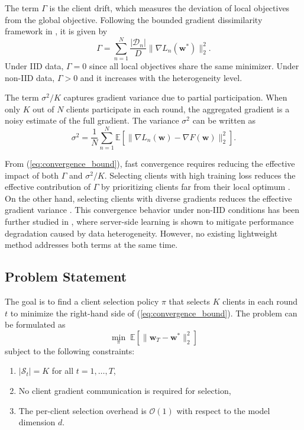 \documentclass[journal]{IEEEtran}
\begin{document}
The term $\Gamma$ is the client drift, which measures the deviation of local objectives from the global objective. Following the bounded gradient dissimilarity framework in \cite{karimireddy2020scaffold}, it is given by
\begin{equation}
\Gamma = \sum_{n=1}^{N} \frac{|\mathcal{D}_n|}{D} \|\nabla L_n(\bm{w}^*)\|_2^2.
\label{eq:client_drift}
\end{equation}
Under IID data, $\Gamma = 0$ since all local objectives share the same minimizer. Under non-IID data, $\Gamma > 0$ and it increases with the heterogeneity level.

The term $\sigma^2/K$ captures gradient variance due to partial participation. When only $K$ out of $N$ clients participate in each round, the aggregated gradient is a noisy estimate of the full gradient. The variance $\sigma^2$ can be written as
\begin{equation}
\sigma^2 = \frac{1}{N} \sum_{n=1}^{N} \mathbb{E}\left[\|\nabla L_n(\bm{w}) - \nabla F(\bm{w})\|_2^2\right].
\label{eq:grad_variance}
\end{equation}

From (\ref{eq:convergence_bound}), fast convergence requires reducing the effective impact of both $\Gamma$ and $\sigma^2/K$. Selecting clients with high training loss reduces the effective contribution of $\Gamma$ by prioritizing clients far from their local optimum \cite{cho2022towards}. On the other hand, selecting clients with diverse gradients reduces the effective gradient variance \cite{balakrishnan2022diverse}. This convergence behavior under non-IID conditions has been further studied in \cite{mai2024study}, where server-side learning is shown to mitigate performance degradation caused by data heterogeneity. However, no existing lightweight method addresses both terms at the same time.

\subsection{Problem Statement}

The goal is to find a client selection policy $\pi$ that selects $K$ clients in each round $t$ to minimize the right-hand side of (\ref{eq:convergence_bound}). The problem can be formulated as
\begin{equation}
\min_{\pi} \; \mathbb{E}\left[\|\bm{w}_T - \bm{w}^*\|_2^2\right]
\label{eq:problem}
\end{equation}
subject to the following constraints:
\begin{enumerate}
    \item $|\mathcal{S}_t| = K$ for all $t = 1, \ldots, T$,
    \item No client gradient communication is required for selection,
    \item The per-client selection overhead is $\mathcal{O}(1)$ with respect to the model dimension $d$.
\end{enumerate}
\end{document}
